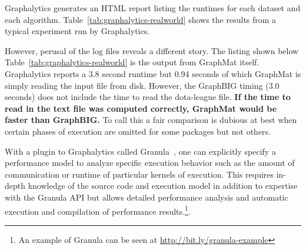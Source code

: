 \documentclass[conference]{IEEEtran}
\begin{document}
Graphalytics generates an HTML report listing the runtimes for each dataset and each algorithm. Table~\ref{tab:graphalytics-realworld} shows the results from a typical experiment run by Graphalytics.

However, perusal of the log files reveals a different story. The listing shown below Table~\ref{tab:graphalytics-realworld} is the output from GraphMat itself. Graphalytics reports a 3.8 second runtime but 0.94 seconds of which GraphMat is simply reading the input file from disk. However, the GraphBIG timing (3.0 seconds) does not include the time to read the dota-league file. \textbf{If the time to read in the text file was computed correctly, GraphMat would be faster than GraphBIG.} To call this a fair comparison is dubious at best when certain phases of execution are omitted for some packages but not others.

With a plugin to Graphalytics called Granula~\cite{Ngai:2015:Granula}, one can explicitly specify a performance model to analyze specific execution behavior such as the amount of communication or runtime of particular kernels of execution. This requires in-depth knowledge of the source code and execution model in addition to expertise with the Granula API but allows detailed performance analysis and automatic execution and compilation of performance results.\footnote{An example of Granula can be seen at \url{http://bit.ly/granula-example}}.
\end{document}

